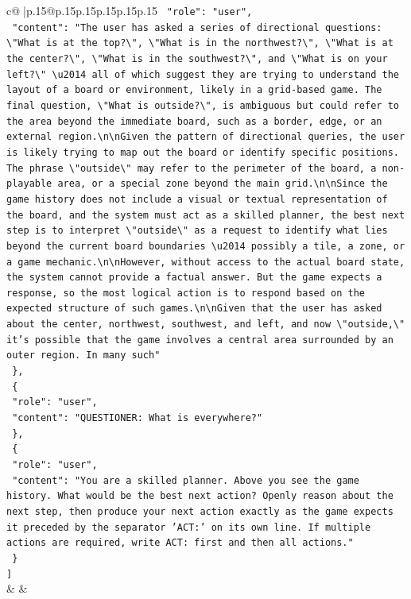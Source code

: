\documentclass{article}
\begin{document}
{\begin{supertabular}{c@{$\;$}|p{.15\linewidth}@{}p{.15\linewidth}p{.15\linewidth}p{.15\linewidth}p{.15\linewidth}p{.15\linewidth}}
{{{\texttt{    "role": "user",} \\
\texttt{    "content": "The user has asked a series of directional questions: \textbackslash{}"What is at the top?\textbackslash{}", \textbackslash{}"What is in the northwest?\textbackslash{}", \textbackslash{}"What is at the center?\textbackslash{}", \textbackslash{}"What is in the southwest?\textbackslash{}", and \textbackslash{}"What is on your left?\textbackslash{}" \textbackslash{}u2014 all of which suggest they are trying to understand the layout of a board or environment, likely in a grid{-}based game. The final question, \textbackslash{}"What is outside?\textbackslash{}", is ambiguous but could refer to the area beyond the immediate board, such as a border, edge, or an external region.\textbackslash{}n\textbackslash{}nGiven the pattern of directional queries, the user is likely trying to map out the board or identify specific positions. The phrase \textbackslash{}"outside\textbackslash{}" may refer to the perimeter of the board, a non{-}playable area, or a special zone beyond the main grid.\textbackslash{}n\textbackslash{}nSince the game history does not include a visual or textual representation of the board, and the system must act as a skilled planner, the best next step is to interpret \textbackslash{}"outside\textbackslash{}" as a request to identify what lies beyond the current board boundaries \textbackslash{}u2014 possibly a tile, a zone, or a game mechanic.\textbackslash{}n\textbackslash{}nHowever, without access to the actual board state, the system cannot provide a factual answer. But the game expects a response, so the most logical action is to respond based on the expected structure of such games.\textbackslash{}n\textbackslash{}nGiven that the user has asked about the center, northwest, southwest, and left, and now \textbackslash{}"outside,\textbackslash{}" it's possible that the game involves a central area surrounded by an outer region. In many such"} \\
\texttt{  \},} \\
\texttt{  \{} \\
\texttt{    "role": "user",} \\
\texttt{    "content": "QUESTIONER: What is everywhere?"} \\
\texttt{  \},} \\
\texttt{  \{} \\
\texttt{    "role": "user",} \\
\texttt{    "content": "You are a skilled planner. Above you see the game history. What would be the best next action? Openly reason about the next step, then produce your next action exactly as the game expects it preceded by the separator 'ACT:' on its own line. If multiple actions are required, write ACT: first and then all actions."} \\
\texttt{  \}} \\
\texttt{{]}} \\
            }
        }
    }
    & & \\ \\


\end{supertabular}}
\end{document}
